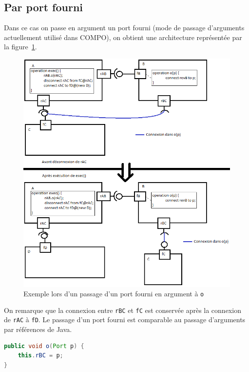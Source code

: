 \documentclass[11pt,a4paper,openany,oneside]{book}
\begin{document}
\clearpage

\subsection{Par port fourni}
\label{passageFourni}

Dans ce cas on passe en argument un port fourni (mode de passage d'arguments actuellement utilisé dans COMPO), on obtient une architecture représentée par la figure~\ref{exempleFourni}.\\
\begin{figure}[H]
\centering
\includegraphics[scale=0.7, keepaspectratio=true]{exempleFourni.png}
\caption{Exemple lors d'un passage d'un port fourni en argument à \texttt{o}}
\label{exempleFourni}
\end{figure}
On remarque que la connexion entre \texttt{rBC} et \texttt{fC} est conservée après la connexion de \texttt{rAC} à \texttt{fD}.
Le passage d'un port fourni est comparable au passage d'arguments par références de Java.

\begin{lstlisting}[language=Java, caption=Equivalent en Java d'un passage de port fourni en paramètre de \texttt{o}]
public void o(Port p) {
    this.rBC = p;    
}
\end{lstlisting}
\end{document}
